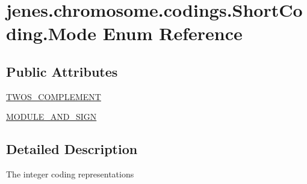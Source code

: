 \hypertarget{enumjenes_1_1chromosome_1_1codings_1_1_short_coding_1_1_mode}{\section{jenes.\-chromosome.\-codings.\-Short\-Coding.\-Mode Enum Reference}
\label{enumjenes_1_1chromosome_1_1codings_1_1_short_coding_1_1_mode}
}
\subsection*{Public Attributes}
\begin{DoxyCompactItemize}
\item 
\hyperlink{enumjenes_1_1chromosome_1_1codings_1_1_short_coding_1_1_mode_a854a732d2e03e2abae158628431dc66d}{T\-W\-O\-S\-\_\-\-C\-O\-M\-P\-L\-E\-M\-E\-N\-T}
\item 
\hyperlink{enumjenes_1_1chromosome_1_1codings_1_1_short_coding_1_1_mode_ad2f4c4c2396201d3f545dfb7bf4d5f7f}{M\-O\-D\-U\-L\-E\-\_\-\-A\-N\-D\-\_\-\-S\-I\-G\-N}
\end{DoxyCompactItemize}


\subsection{Detailed Description}
The integer coding representations 


